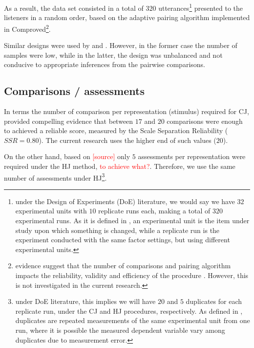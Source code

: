 As a result, the data set consisted in a total of $320$ utterances\footnote{under the Design of Experiments (DoE) literature, we would say we have $32$ experimental units with $10$ replicate runs each, making a total of $320$ experimental runs. As it is defined in \citet{Lawson_2015}, an experimental unit is the item under study upon which something is changed, while a replicate run is the experiment conducted with the same factor settings, but using different experimental units.} presented to the listeners in a random order, based on the adaptive pairing algorithm \citep{Pollitt_2012b} implemented in Comproved\footnote{evidence suggest that the number of comparisons and pairing algorithm impacts the reliability, validity and efficiency of the procedure \citep{Bramley_2015, Bramley_et_al_2018, Lesterhuis_2018, Verhavert_et_al_2019}. However, this is not investigated in the current research.}.

Similar designs were used by \citet{Boonen_et_al_2020} and \citet{Faes_et_al_2021}. However, in the former case the number of samples were low, while in the latter, the design was unbalanced and not conducive to appropriate inferences from the pairwise comparisons.
%
%
\subsection{Comparisons / assessments}
%
In terms the number of comparison per representation (stimulus) required for CJ, \citet{Verhavert_2018} provided compelling evidence that between $17$ and $20$ comparisons were enough to achieved a reliable score, measured by the Scale Separation Reliability ($SSR=0.80$). The current research uses the higher end of such values ($20$). 

On the other hand, based on \textcolor{red}{[source]} only $5$ assessments per representation were required under the HJ method, \textcolor{red}{to achieve what?}. Therefore, we use the same number of assessments under HJ\footnote{under DoE literature, this implies we will have $20$ and $5$ duplicates for each replicate run, under the CJ and HJ procedures, respectively. As defined in \citet{Lawson_2015}, duplicates are repeated measurements of the same experimental unit from one run, where it is possible the measured dependent variable vary among duplicates due to measurement error.}.
%
%
